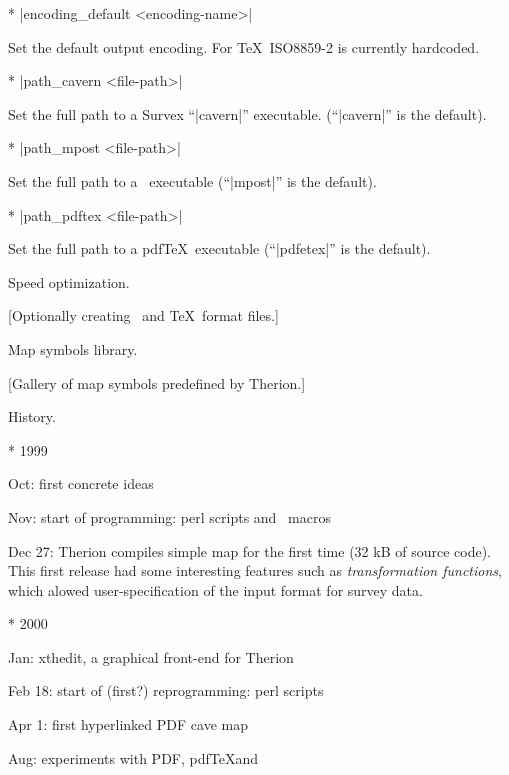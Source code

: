 \list
* |encoding_default <encoding-name>|

        Set the default output encoding. For \TeX\ ISO8859-2 is currently
        hardcoded.
        
* |path_cavern <file-path>|

        Set the full path to a Survex ``|cavern|'' executable. (``|cavern|'' is the default).
        
* |path_mpost <file-path>|

        Set the full path to a \MP\ executable (``|mpost|'' is the default).

* |path_pdftex <file-path>|

        Set the full path to a pdf\TeX\ executable (``|pdfetex|'' is the default).
\endlist



\subsubchapter Speed optimization.

[Optionally creating \MP\ and \TeX\ format files.]


\subchapter Map symbols library.

[Gallery of map symbols predefined by Therion.]


\subchapter History.

\list
* 1999

  Oct: first concrete ideas

  Nov: start of programming: perl scripts and \MP\ macros

  Dec 27: Therion compiles simple map for the first time
       (32 kB of source code). This first release had some interesting features
       such as {\it transformation functions}, which alowed user-specification
       of the input format for survey data.
				
* 2000

  Jan: xthedit, a graphical front-end for Therion

  Feb 18: start of (first?) reprogramming: perl scripts

  Apr 1: first hyperlinked PDF cave map 

  Aug: experiments with PDF, pdf\TeX and \MP

